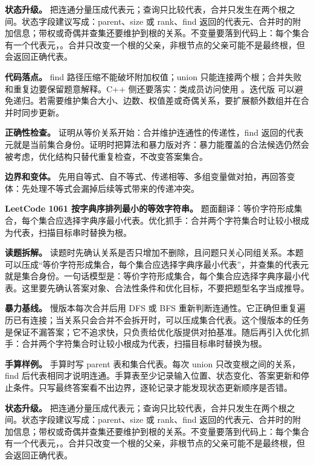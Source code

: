 \textbf{状态升级。} 把连通分量压成代表元；查询只比较代表，合并只发生在两个根之间。状态字段建议写成：parent、size 或 rank、find 返回的代表元、合并时的附加信息；带权或奇偶并查集还要维护到根的关系。不变量要落到代码上：每个集合有一个代表元，。合并只改变一个根的父亲，非根节点的父亲可能不是最终根，但  会返回正确代表。

\textbf{代码落点。} find 路径压缩不能破坏附加权值；union 只能连接两个根；合并失败和重复边要保留题意解释。C++ 侧还要落实：类成员访问使用 。迭代版  可以避免递归。若需要维护集合大小、边数、权值差或奇偶关系，要扩展额外数组并在合并时同步更新。

\textbf{正确性检查。} 证明从等价关系开始：合并维护连通性的传递性，find 返回的代表元就是当前集合身份。证明时把算法和暴力版对齐：暴力能覆盖的合法候选仍然会被考虑，优化结构只替代重复检查，不改变答案集合。

\textbf{边界和变体。} 先用自等式、自不等式、传递相等、多组变量做对拍，再回答变体：先处理不等式会漏掉后续等式带来的传递冲突。

\noindent\textbf{LeetCode 1061 按字典序排列最小的等效字符串。} 题面翻译：等价字符形成集合，每个集合应选择字典序最小代表。优化抓手：合并两个字符集合时让较小根成为代表，扫描目标串时替换为根。

\textbf{读题拆解。} 读题时先确认关系是否只增加不删除，且问题只关心同组关系。本题可以压成“等价字符形成集合，每个集合应选择字典序最小代表”，并查集的代表元就是集合身份。一句话模型是：等价字符形成集合，每个集合应选择字典序最小代表。这里要先确认答案对象、合法性条件和优化目标，不要把题型名字当成推导。

\textbf{暴力基线。} 慢版本每次合并后用 DFS 或 BFS 重新判断连通性。它正确但重复遍历已有连接；当关系只会合并不会拆开时，可以压成集合代表。这个慢版本的任务是保证不漏答案；它不追求快，只负责给优化版提供对拍基准。随后再引入优化抓手：合并两个字符集合时让较小根成为代表，扫描目标串时替换为根。

\textbf{手算样例。} 手算时写 parent 表和集合代表。每次 union 只改变根之间的关系，find 后代表相同才说明连通。手算表至少记录输入位置、状态变化、答案更新和停止条件。只写最终答案看不出边界，逐轮记录才能发现状态更新顺序是否错。

\textbf{状态升级。} 把连通分量压成代表元；查询只比较代表，合并只发生在两个根之间。状态字段建议写成：parent、size 或 rank、find 返回的代表元、合并时的附加信息；带权或奇偶并查集还要维护到根的关系。不变量要落到代码上：每个集合有一个代表元，。合并只改变一个根的父亲，非根节点的父亲可能不是最终根，但  会返回正确代表。

